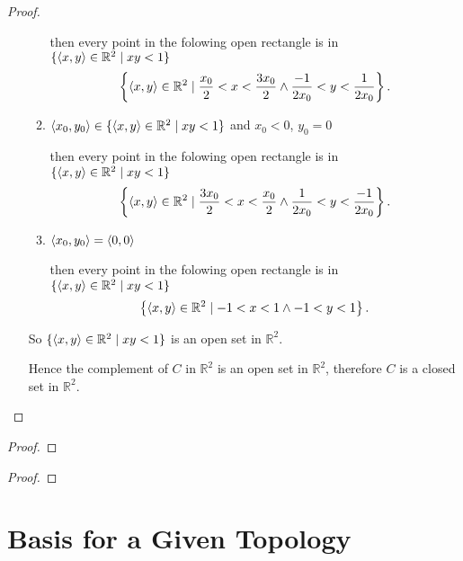 \begin{proof}
\begin{enumerate}[label={(\roman*)}]
\begin{enumerate}[label={\textbf{Case \arabic*.}},itemindent=1cm]
			            then every point in the folowing open rectangle is in $\{ \left\langle{x, y}\right\rangle\in \mathbb{R}^{2} \mid xy < 1 \}$
			            \[
				            \left\{ \left\langle{x, y}\right\rangle\in \mathbb{R}^{2} \mid \frac{x_{0}}{2} < x < \frac{3x_{0}}{2} \wedge \frac{-1}{2x_{0}} < y < \frac{1}{2x_{0}} \right\}.
			            \]
			      \item $\left\langle{x_{0}, y_{0}}\right\rangle\in \{ \left\langle{x, y}\right\rangle\in \mathbb{R}^{2} \mid xy < 1 \}$ and $x_{0} < 0$, $y_{0} = 0$

			            then every point in the folowing open rectangle is in $\{ \left\langle{x, y}\right\rangle\in \mathbb{R}^{2} \mid xy < 1 \}$
			            \[
				            \left\{ \left\langle{x, y}\right\rangle\in \mathbb{R}^{2} \mid \frac{3x_{0}}{2} < x < \frac{x_{0}}{2} \wedge \frac{1}{2x_{0}} < y < \frac{-1}{2x_{0}}\right\}.
			            \]
			      \item $\left\langle{x_{0}, y_{0}}\right\rangle = \left\langle{0, 0}\right\rangle$

			            then every point in the folowing open rectangle is in $\{ \left\langle{x, y}\right\rangle\in \mathbb{R}^{2} \mid xy < 1 \}$
			            \[
				            \left\{ \left\langle{x, y}\right\rangle\in \mathbb{R}^{2} \mid -1 < x < 1 \wedge -1 < y < 1 \right\}.
			            \]
		      \end{enumerate}

		      So $\{ \left\langle{x, y}\right\rangle\in \mathbb{R}^{2} \mid xy < 1 \}$ is an open set in $\mathbb{R}^{2}$.

		      Hence the complement of $C$ in $\mathbb{R}^{2}$ is an open set in $\mathbb{R}^{2}$, therefore $C$ is a closed set in $\mathbb{R}^{2}$.
	\end{enumerate}
\end{proof}
\newpage

\begin{exercise}
\end{exercise}

\begin{proof}
\end{proof}
\newpage

\begin{exercise}
\end{exercise}

\begin{proof}
\end{proof}
\newpage

\section{Basis for a Given Topology}
